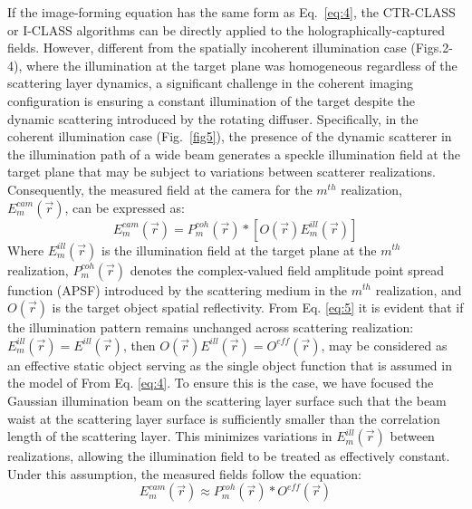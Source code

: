\documentclass[pdflatex,sn-mathphys-num]{sn-jnl}%
\theoremstyle{thmstyleone}%
\theoremstyle{thmstyletwo}%
\theoremstyle{thmstylethree}%
\begin{document}
If the image-forming equation has the same form as Eq.~\ref{eq:4}, the CTR-CLASS or I-CLASS algorithms can be directly applied to the holographically-captured fields. However, different from the spatially incoherent illumination case (Figs.2-4), where the illumination at the target plane was homogeneous regardless of the scattering layer dynamics, a significant challenge in the coherent imaging configuration is ensuring a constant illumination of the target despite the dynamic scattering introduced by the rotating diffuser. %
Specifically, in the coherent illumination case (Fig.~\ref{fig5}), the presence of the dynamic scatterer in the illumination path of a wide beam generates a speckle illumination field at the target plane that may be subject to variations between scatterer realizations. Consequently, the measured field at the camera for the $m^{th}$ realization, $E^{cam}_m(\vec{r})$, can be expressed as:
\begin{equation}
E_m^{cam}(\vec{r})=P^{coh}_m(\vec{r}) * \left[ O(\vec{r}) E_m^{{ill}}(\vec{r}) \right]
\label{eq:5}
\end{equation}
Where $E_m^{{ill}}(\vec{r})$ is the illumination field at the target plane at the $m^{th}$ realization, $P^{coh}_m(\vec{r})$ denotes the complex-valued field amplitude point spread function (APSF) introduced by the scattering medium in the $m^{th}$ realization, and $O(\vec{r})$ is the target object spatial reflectivity. From Eq. \ref{eq:5} it is evident that if the illumination pattern remains unchanged across scattering realization: $E_m^{{ill}}(\vec{r})=E^{{ill}}(\vec{r})$, then \(O(\vec{r}) E^{{ill}}(\vec{r})=O^{{eff}}(\vec{r})  \), may be considered as an effective static object serving as the single object function that is assumed in the model of  From Eq. \ref{eq:4}.
To ensure this is the case, we have focused the Gaussian illumination beam on the scattering layer surface such that the beam waist at the scattering layer surface is sufficiently smaller than the correlation length of the scattering layer. This minimizes variations in $E_m^{{ill}}(\vec{r})$ between realizations, allowing the illumination field to be treated as effectively constant.
Under this assumption, the measured fields follow the equation:
\begin{equation}
E_m^{cam}(\vec{r}) \approx P^{coh}_m(\vec{r}) * O^{{eff}}(\vec{r})
\label{coherent eq.}
\end{equation}
\end{document}

